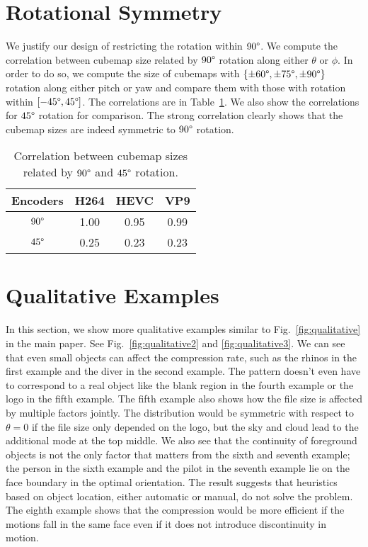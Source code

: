 \documentclass[journal,transmag]{IEEEtran}
\begin{document}
\section{Rotational Symmetry}

We justify our design of restricting the rotation within $90\degree$.
We compute the correlation between cubemap size related by $90\degree$ rotation along either $\theta$ or $\phi$.
In order to do so,
we compute the size of cubemaps with $\{\pm60\degree, \pm75\degree, \pm90\degree\}$ rotation along either pitch or yaw and compare them with those with rotation within $[-45\degree, 45\degree]$.
The correlations are in Table~\ref{tab:rotation}.
We also show the correlations for $45\degree$ rotation for comparison.
The strong correlation clearly shows that the cubemap sizes are indeed symmetric to $90\degree$ rotation.

\begin{table}[h]
    \small
    \center
    \begin{tabular}{cccc}
    \toprule
    Encoders & H264 & HEVC & VP9\\
    \midrule
        $90\degree$ & 1.00  & 0.95 & 0.99\\
        $45\degree$ & 0.25  & 0.23 & 0.23 \\
    \bottomrule
    \end{tabular}
    \caption{
        Correlation between cubemap sizes related by $90\degree$ and $45\degree$ rotation.
    }
    \label{tab:rotation}
\end{table}\section{Qualitative Examples}

In this section, we show more qualitative examples similar to Fig.~\ref{fig:qualitative} in the main paper.
See Fig.~\ref{fig:qualitative2} and \ref{fig:qualitative3}.
We can see that even small objects can affect the compression rate,
such as the rhinos in the first example and the diver in the second example.
The pattern doesn't even have to correspond to a real object like the blank region in the fourth example or the logo in the fifth example.
The fifth example also shows how the file size is affected by multiple factors jointly.
The distribution would be symmetric with respect to $\theta{=}0$ if the file size only depended on the logo,
but the sky and cloud lead to the additional mode at the top middle.
We also see that the continuity of foreground objects is not the only factor that matters from the sixth and seventh example;
the person in the sixth example and the pilot in the seventh example lie on the face boundary in the optimal orientation.
The result suggests that heuristics based on object location, either automatic or manual, do not solve the problem.
The eighth example shows that the compression would be more efficient if the motions fall in the same face even if it does not introduce discontinuity in motion.
\end{document}
